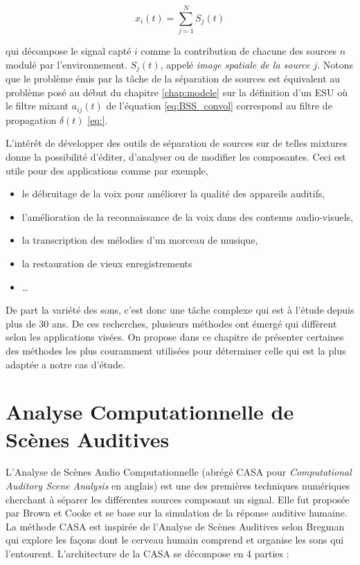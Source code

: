 \begin{equation}
x_i(t) = \sum_{j = 1}^{N}S_j(t)
\end{equation}


qui décompose le signal capté $i$ comme la contribution de chacune des sources $n$ modulé par l'environnement. $S_j(t)$, appelé \textit{image spatiale de la source $j$}. 
Notons que le problème émis par la tâche de la séparation de sources est équivalent au problème posé au début du chapitre \ref{chap:modele} sur la définition d'un ESU où le filtre mixant $a_{ij}(t)$ de l'équation \ref{eq:BSS_convol} correspond au filtre de propagation $\delta(t)$ \ref{eq:}. 

L'intérêt de développer des outils de séparation de sources sur de telles mixtures donne la possibilité d'éditer, d'analyser ou de modifier les composantes. Ceci est utile pour des applications comme par exemple,

\begin{itemize}
\item le débruitage de la voix pour améliorer la qualité des appareils auditifs,
\item l'amélioration de la reconnaissance de la voix dans des contenus audio-visuels,
\item la transcription des mélodies d'un morceau de musique,
\item la restauration de vieux enregistrements
\item \dots
\end{itemize}

De part la variété des sons, c'est donc une tâche complexe qui est à l'étude depuis plus de 30 ans. De ces recherches, plusieurs méthodes ont émergé qui diffèrent selon les applications visées. On propose dans ce chapitre de présenter certaines des méthodes les plus couramment utilisées pour déterminer celle qui est la plus adaptée a notre cas d'étude.

\section{Analyse Computationnelle de Scènes Auditives }

L'Analyse de Scènes Audio Computationnelle (abrégé CASA pour \textit{Computational Auditory Scene Analysis} en anglais) est une des premières techniques numériques cherchant à séparer les différentes sources composant un signal. Elle fut proposée par Brown et Cooke \cite{brown1994computational} et se base sur la simulation de la réponse auditive humaine.
La méthode CASA est inspirée de l'Analyse de Scènes Auditives selon Bregman \cite{bregman1994auditory} qui explore les façons dont le cerveau humain comprend et organise les sons qui l'entourent. L'architecture de la CASA se décompose en 4 parties \cite{wang2006computational} :

